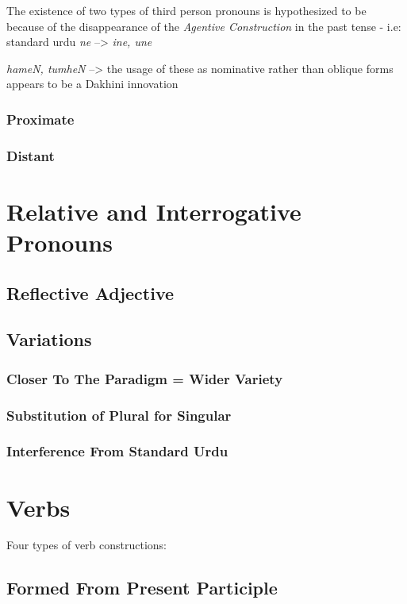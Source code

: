 \documentclass[a4paper]{article}
\begin{document}
The existence of two types of third person pronouns is hypothesized to be because of the disappearance of the \emph{Agentive Construction} in the past tense - i.e: standard urdu \textit{ne} --> \textit{ine, une}

\textit{hameN, tumheN} --> the usage of these as nominative rather than oblique forms appears to be a Dakhini innovation

\subsubsection{Proximate}
\subsubsection{Distant}

\section{Relative and Interrogative Pronouns}

\subsection{Reflective Adjective}

\subsection{Variations}

\subsubsection{Closer To The Paradigm = Wider Variety}
\subsubsection{Substitution of Plural for Singular}
\subsubsection{Interference From Standard Urdu}

\section{Verbs}

Four types of verb constructions:

\subsection{Formed From Present Participle}
\end{document}
